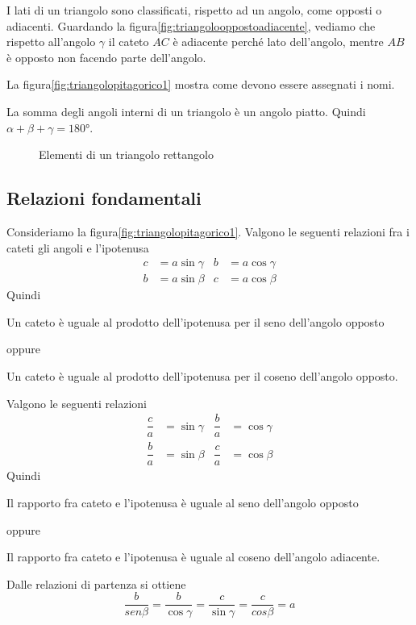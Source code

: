 I lati di un triangolo sono classificati, rispetto ad un angolo, come opposti o adiacenti. Guardando la figura\nobs\vref{fig:triangolooppostoadiacente}, vediamo che rispetto all'angolo $\gamma$ il cateto $AC$ è adiacente perché lato dell'angolo, mentre $AB$ è opposto  non facendo parte dell'angolo. 
 
 La figura\nobs\vref{fig:triangolopitagorico1} mostra come devono essere assegnati i nomi.
 
 La somma degli angoli interni di un triangolo è un angolo piatto. Quindi $\alpha+\beta+\gamma=\ang{180}$. 
\begin{figure}
	\centering
	
	\caption{Elementi di un triangolo rettangolo}
	\label{fig:triangolooppostoadiacente}
\end{figure}
\subsection{Relazioni fondamentali}
Consideriamo la figura\nobs\vref{fig:triangolopitagorico1}. Valgono le seguenti relazioni fra i cateti gli angoli e l'ipotenusa
\begin{align*}
c&=a\sin\gamma&b&=a\cos\gamma\\
b&=a\sin\beta&c&=a\cos\beta
\end{align*}
Quindi

Un cateto è uguale  al prodotto dell'ipotenusa per il seno dell'angolo opposto

\noindent oppure

Un cateto è uguale al prodotto dell'ipotenusa per il coseno dell'angolo opposto.

\noindent Valgono le seguenti relazioni
\begin{align*}
\dfrac{c}{a}&=\sin\gamma&\dfrac{b}{a}&=\cos\gamma\\
\dfrac{b}{a}&=\sin\beta&\dfrac{c}{a}&=\cos\beta
\end{align*}
Quindi

Il rapporto fra  cateto e l'ipotenusa è uguale al seno dell'angolo opposto

\noindent oppure

Il rapporto fra  cateto e l'ipotenusa è uguale al coseno dell'angolo adiacente.

\noindent Dalle relazioni di partenza si ottiene
\[\dfrac{b}{sen\beta}=\dfrac{b}{\cos\gamma}=\dfrac{c}{\sin\gamma}=\dfrac{c}{cos\beta}=a \]

